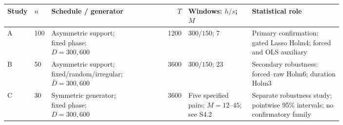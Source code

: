 \begingroup
\setlength{\tabcolsep}{3pt}
\renewcommand{\arraystretch}{1.12}
\begin{tabular}{@{}p{0.055\linewidth}p{0.045\linewidth}p{0.24\linewidth}rp{0.19\linewidth}p{0.27\linewidth}@{}}
\toprule
{\raggedright Study\par} & {\raggedright $n$\par} & {\raggedright Schedule / generator\par} & $T$ & {\raggedright Windows: $h/s$; $M$\par} & {\raggedright Statistical role\par} \\
\midrule
{\raggedright A\par} & {\raggedright 100\par} & {\raggedright Asymmetric support; fixed phase; $D=300,600$\par} & 1200 & {\raggedright $300/150$; $7$\par} & {\raggedright Primary confirmation: gated Lasso Holm4; forced and OLS auxiliary\par} \\
{\raggedright B\par} & {\raggedright 50\par} & {\raggedright Asymmetric support; fixed/random/irregular; $\bar D=300,600$\par} & 3600 & {\raggedright $300/150$; $23$\par} & {\raggedright Secondary robustness: forced--raw Holm6; duration Holm3\par} \\
{\raggedright C\par} & {\raggedright 30\par} & {\raggedright Symmetric generator; fixed phase; $D=300,600$\par} & 3600 & {\raggedright Five specified pairs; $M=12$--$45$; see S4.2\par} & {\raggedright Separate robustness study; pointwise 95\% intervals; no confirmatory family\par} \\
\bottomrule
\end{tabular}
\endgroup
